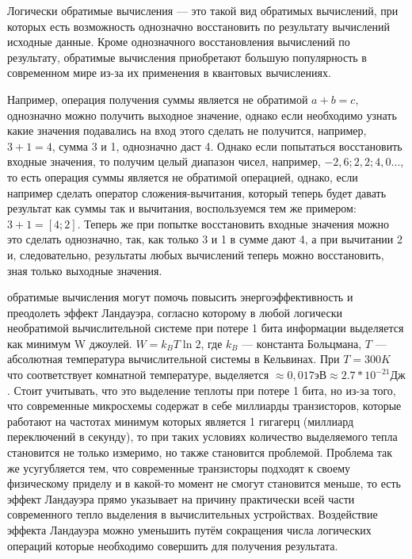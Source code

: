 \documentclass[14pt]{extarticle} %
\begin{document}
Логически обратимые вычисления --- это такой вид обратимых вычислений, при которых есть возможность однозначно восстановить по результату вычислений исходные данные. Кроме однозначного восстановления вычислений по результату, обратимые вычисления приобретают большую популярность в современном мире из-за их применения в квантовых вычислениях.

Например, операция получения суммы является не обратимой $a+b=c$, однозначно можно получить выходное значение, однако если необходимо узнать какие значения подавались на вход этого сделать не получится, например, $3+1=4$, сумма 3 и 1, однозначно даст 4. Однако если попытаться восстановить входные значения, то получим целый диапазон чисел, например, $-2,6;2,2;4,0 \ldots$, то есть операция суммы является не обратимой операцией, однако, если например сделать оператор сложения-вычитания, который теперь будет давать результат как суммы так и вычитания, воспользуемся тем же примером: $3+1=[4;2]$. Теперь же при попытке восстановить входные значения можно это сделать однозначно, так, как только 3 и 1 в сумме дают 4, а при вычитании 2 и, следовательно, результаты любых вычислений теперь можно восстановить, зная только выходные значения.

обратимые вычисления могут помочь повысить энергоэффективность и преодолеть эффект Ландауэра, согласно которому в любой логически необратимой вычислительной системе при потере 1 бита информации выделяется как минимум W джоулей. $W=k_{B}T\ln 2$, где $k_{B}$ --- константа Больцмана, $T$ --- абсолютная температура вычислительной системы в Кельвинах. При $T=300 K$ что соответствует комнатной температуре, выделяется $\approx 0,017эВ \approx 2.7*10^{-21} Дж$.
Стоит учитывать, что это выделение теплоты при потере 1 бита, но из-за того, что современные микросхемы содержат в себе миллиарды транзисторов, которые работают на частотах минимум которых является 1 гигагерц (миллиард переключений в секунду), то при таких условиях количество выделяемого тепла становится не только измеримо, но также становится проблемой. Проблема так же усугубляется тем, что современные транзисторы подходят к своему физическому приделу и в какой-то момент не смогут становится меньше, то есть эффект Ландауэра прямо указывает на причину практически всей части современного тепло выделения в вычислительных устройствах. Воздействие эффекта Ландауэра можно уменьшить путём сокращения числа логических операций которые необходимо совершить для получения результата.  



\end{document}
